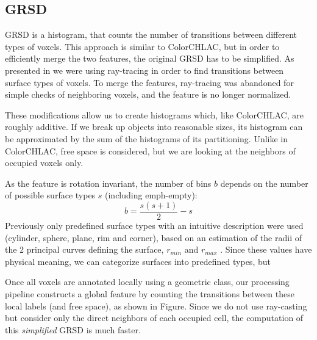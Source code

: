 \documentclass[conference]{sty/IEEEtran}
\begin{document}
\subsection{GRSD}
%
GRSD is a histogram, that counts the number of transitions between different types of voxels.
This approach is similar to ColorCHLAC, but in order to efficiently merge the two features,
the original GRSD has to be simplified. As presented in \cite{GRSD10Humanoids} we were using
ray-tracing in order to find transitions between surface types of voxels. To merge the features,
ray-tracing was abandoned for simple checks of neighboring voxels, and the feature is no longer normalized.

These modifications allow us to create histograms which, like ColorCHLAC, are roughly additive.
If we break up objects into reasonable sizes, its histogram can be approximated by the sum of the
histograms of its partitioning. Unlike in ColorCHLAC, free space is considered, but we are looking
at the neighbors of occupied voxels only.

As the feature is rotation invariant, the number of bins $b$ depends on the number of possible surface types $s$ (including emph-empty):
\begin{equation}
b=\frac{s(s+1)}{2}-s
\end{equation}
Previously only predefined surface types with an intuitive description were used (cylinder, sphere, plane, rim and corner),
based on an estimation of the radii of the 2 principal curves defining the surface, $r_{min}$ and $r_{max}$ \cite{Marton10IROS}.
Since these values have physical meaning, we can categorize surfaces into predefined types, but

Once all voxels are annotated locally using a geometric class, our
processing pipeline constructs a global feature by counting the transitions
between these local labels (and free space), as shown in Figure\todo{~\ref{fig:grsd}}.
Since we do not use ray-casting but consider only the direct neighbors
of each occupied cell, the computation of this \emph{simplified} GRSD is much faster.
\end{document}
